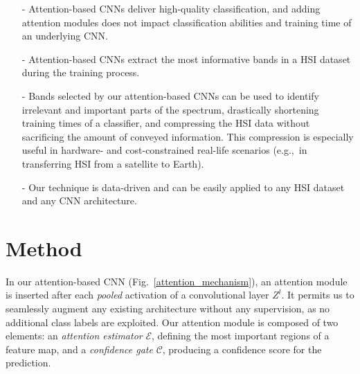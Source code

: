 \documentclass[journal]{IEEEtran}
\newcommand{\Activation}{$\mathit{Z}^ {l}$}
\newcommand{\AttentionEstimator}{$\mathcal{E}$}
\newcommand{\ConfidenceGate}{$\mathcal{C}$}
\begin{document}
\begin{itemize}
\item[-] Attention-based CNNs deliver high-quality classification, and adding attention modules does not impact classification abilities and training time of an underlying CNN.
\item[-] Attention-based CNNs extract the most informative bands in a HSI dataset during the training process.
\item[-] Bands selected by our attention-based CNNs can be used to identify irrelevant and important parts of the spectrum, drastically shortening training times of a classifier, and compressing the HSI data without sacrificing the amount of conveyed information. This compression is especially useful in hardware- and cost-constrained real-life scenarios (e.g.,~in transferring HSI from a satellite to Earth).
\item[-] Our technique is data-driven and can be easily applied to any HSI dataset and any CNN architecture.
\end{itemize}


%

\section{Method}\label{sec:method}


In our attention-based CNN (Fig.~\ref{attention_mechanism}), an attention module is inserted after each \emph{pooled} activation of a convolutional layer \Activation. It permits us to seamlessly augment any existing architecture without any supervision, as no additional class labels are exploited. Our attention module is composed of two elements: an \emph{attention estimator} \AttentionEstimator, defining the most important regions of a feature map, and a \emph{confidence gate} \ConfidenceGate, producing a confidence score for the prediction.
\end{document}
